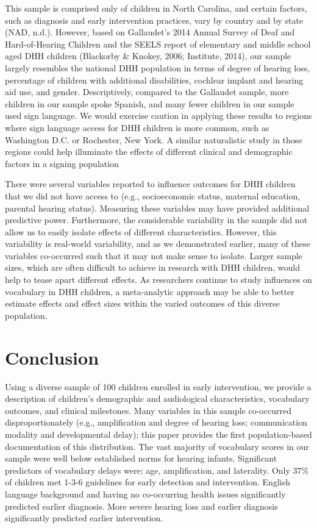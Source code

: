 \documentclass[
  english,
  man]{apa6}
\begin{document}
This sample is comprised only of children in North Carolina, and certain factors, such as diagnosis and early intervention practices, vary by country and by state (NAD, n.d.). However, based on Gallaudet's 2014 Annual Survey of Deaf and Hard-of-Hearing Children and the SEELS report of elementary and middle school aged DHH children (Blackorby \& Knokey, 2006; Institute, 2014), our sample largely resembles the national DHH population in terms of degree of hearing loss, percentage of children with additional disabilities, cochlear implant and hearing aid use, and gender. Descriptively, compared to the Gallaudet sample, more children in our sample spoke Spanish, and many fewer children in our sample used sign language. We would exercise caution in applying these results to regions where sign language access for DHH children is more common, such as Washington D.C. or Rochester, New York. A similar naturalistic study in those regions could help illuminate the effects of different clinical and demographic factors in a signing population

There were several variables reported to influence outcomes for DHH children that we did not have access to (e.g., socioeconomic status, maternal education, parental hearing status). Measuring these variables may have provided additional predictive power. Furthermore, the considerable variability in the sample did not allow us to easily isolate effects of different characteristics. However, this variability is real-world variability, and as we demonstrated earlier, many of these variables co-occurred such that it may not make sense to isolate. Larger sample sizes, which are often difficult to achieve in research with DHH children, would help to tease apart different effects. As researchers continue to study influences on vocabulary in DHH children, a meta-analytic approach may be able to better estimate effects and effect sizes within the varied outcomes of this diverse population.

\hypertarget{conclusion}{%
\section{Conclusion}\label{conclusion}}

Using a diverse sample of 100 children enrolled in early intervention, we provide a description of children's demographic and audiological characteristics, vocabulary outcomes, and clinical milestones. Many variables in this sample co-occurred disproportionately (e.g., amplification and degree of hearing loss; communication modality and developmental delay); this paper provides the first population-based documentation of this distribution. The vast majority of vocabulary scores in our sample were well below established norms for hearing infants. Significant predictors of vocabulary delays were: age, amplification, and laterality. Only 37\% of children met 1-3-6 guidelines for early detection and intervention. English language background and having no co-occurring health issues significantly predicted earlier diagnosis. More severe hearing loss and earlier diagnosis significantly predicted earlier intervention.
\end{document}
